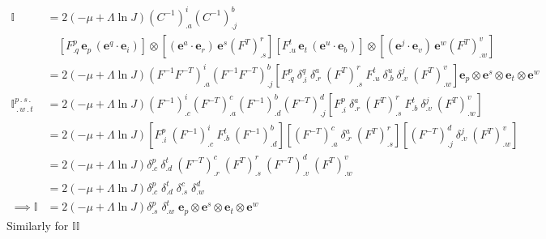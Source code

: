 \begin{equation} \label{eq:I}
    \begin{split}
        \mathbb{I} &= 2\left(-\mu + \Lambda\ln{J}\right)\left(C^{-1}\right)^i_{.a} \left(C^{-1}\right)^b_{.j} \\
        &\quad \left[F^p_{.q} \, \boldsymbol{e}_p \,(\boldsymbol{e}^q \cdot \boldsymbol{e}_i)\right] \otimes \left[(\boldsymbol{e}^a \cdot \boldsymbol{e}_r)\, \boldsymbol{e}^s \left(F^T\right)^r_{.s}\right] \left[F^t_{.u} \,\boldsymbol{e}_t \,(\boldsymbol{e}^u \cdot \boldsymbol{e}_b)\right] \otimes \left[(\boldsymbol{e}^j \cdot \boldsymbol{e}_v) \,\boldsymbol{e}^w \left(F^T\right)^v_{.w} \right]\\
        &= 2\left(-\mu + \Lambda\ln{J}\right) \left(F^{-1}F^{-T}\right)^i_{.a} \left(F^{-1}F^{-T}\right)^b_{.j} \left[F^p_{.q} \: \delta^q_{.i} \: \delta^a_{.r} \: (F^T)^r_{.s} \: F^t_{.u} \: \delta^u_{.b} \: \delta^j_{.v} \: (F^T)^v_{.w} \right] \boldsymbol{e}_p \otimes \boldsymbol{e}^s \otimes \boldsymbol{e}_t \otimes \boldsymbol{e}^w\\
        \mathbb{I}^{p\,.\,s\,.}_{\,.\,w\,.\,t} & = 2\left(-\mu + \Lambda\ln{J}\right) \left(F^{-1}\right)^i_{.c} \left(F^{-T}\right)^c_{.a} \left(F^{-1}\right)^b_{.d} \left(F^{-T}\right)^d_{.j} \left[F^p_{.i} \: \delta^a_{.r} \: (F^T)^r_{.s} \: F^t_{.b} \: \delta^j_{.v} \: (F^T)^v_{.w}\right]\\
        & = 2\left(-\mu + \Lambda\ln{J}\right)\left[ F^p_{.i} \: (F^{-1})^i_{.c} \: F^t_{.b} \: (F^{-1})^b_{.d}\right] \left[(F^{-T})^c_{.a} \: \delta^a_{.r} \: (F^T)^r_{.s}\right] \left[(F^{-T})^d_{.j} \:  \delta^j_{.v} \: (F^T)^v_{.w}\right]\\
        & =  2\left(-\mu + \Lambda\ln{J}\right) \delta^p_{.c} \: \delta^t_{.d} \: (F^{-T})^c_{.r} \: (F^T)^r_{.s} \: (F^{-T})^d_{.v} \: (F^T)^v_{.w} \\
        &= 2\left(-\mu + \Lambda\ln{J}\right) \delta^p_{.c} \; \delta^t_{.d} \; \delta^c_{.s} \; \delta^d_{.w}\\
    \implies \mathbb{I} &= 2\left(-\mu + \Lambda\ln{J}\right) \delta^p_{.s} \; \delta^t_{.w} \; \boldsymbol{e}_p \otimes \boldsymbol{e}^s \otimes \boldsymbol{e}_t \otimes \boldsymbol{e}^w
    \end{split}
\end{equation}
Similarly for $\mathbb{II}$
